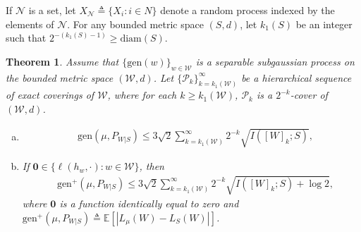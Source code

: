 \documentclass{article}
\newtheorem{theorem}{Theorem}
\newcommand{\E}{\mathbb{E}}
\newcommand{\gen}{\mathrm{gen}}
\begin{document}
If $\mathcal{N}$ is a set, let $X_{\mathcal{N}} \triangleq \{X_i : i \in N\}$ denote a random process indexed by the elements of $\mathcal{N}$.
For any bounded metric space $(S,d)$, let $k_1(S)$ be an integer such that $2^{-(k_1(S)-1)}\geq \mathrm{diam}(S)$.
\begin{theorem}\label{Generalization with chaining MI} Assume that $\{\mathrm{gen}(w)\}_{w\in \mathcal{W}}$ is a separable subgaussian process on the bounded metric space $(\mathcal{W},d)$. Let $\{\mathcal{P}_k\}_{k=k_1(\mathcal{W})}^{\infty}$ be a hierarchical sequence of exact coverings of $\mathcal{W}$, where for each $k\geq k_1(\mathcal{W})$, $\mathcal{P}_k$ is a $ 2^{-k}$-cover of $(\mathcal{W},d)$. 
\begin{enumerate}[(a)]
\item 
\begin{align}
&\mathrm{gen}(\mu, P_{W|S})\leq 3\sqrt{2} \sum_{k=k_1(\mathcal{W})}^{\infty}2^{-k}\sqrt{I([W]_k;S)},\nonumber
\end{align}
\item If $\mathbf{0}\in \{\ell(h_w,\cdot): w\in\mathcal{W}\}$, then
\begin{align}
&\mathrm{gen^+}(\mu, P_{W|S})\leq 3\sqrt{2} \sum_{k=k_1(\mathcal{W})}^{\infty}2^{-k}\sqrt{I([W]_k;S)+\log 2}, \nonumber
\end{align}
where $\mathbf{0}$ is a function identically equal to zero and $\gen^+(\mu,P_{W|S}) \triangleq \E\left[|L_{\mu}(W)- L_S(W)|\right]$. 
\end{enumerate}
\end{theorem}
\end{document}
